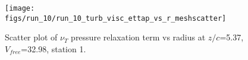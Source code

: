 \begin{figure}[H]
\centering
\texttt{[image: figs/run\_10/run\_10\_turb\_visc\_ettap\_vs\_r\_meshscatter]}
\caption{Scatter plot of $\nu_T$ pressure relaxation term vs radius at $z/c$=5.37, $V_{free}$=32.98, station 1.}
\label{fig:run_10_turb_visc_ettap_vs_r_meshscatter}
\end{figure}


